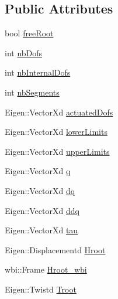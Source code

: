 \subsection*{\-Public \-Attributes}
\begin{DoxyCompactItemize}
\item 
bool \hyperlink{structOcraWbiModel_1_1OcraWbiModel__pimpl_ac779ed6d908a6e1773ce4be340bd8182}{free\-Root}
\item 
int \hyperlink{structOcraWbiModel_1_1OcraWbiModel__pimpl_a311221586ff8ca7d778b3c51129f8dd2}{nb\-Dofs}
\item 
int \hyperlink{structOcraWbiModel_1_1OcraWbiModel__pimpl_aa90eceb0093c8efcdb63be8712c3855c}{nb\-Internal\-Dofs}
\item 
int \hyperlink{structOcraWbiModel_1_1OcraWbiModel__pimpl_aae0928d1a4394598af740ab151e0d7db}{nb\-Segments}
\item 
\-Eigen\-::\-Vector\-Xd \hyperlink{structOcraWbiModel_1_1OcraWbiModel__pimpl_aca1e7991e3aa3941dfb08b58b4f8e82c}{actuated\-Dofs}
\item 
\-Eigen\-::\-Vector\-Xd \hyperlink{structOcraWbiModel_1_1OcraWbiModel__pimpl_aafa8af9a88392dbb874459894cbf181a}{lower\-Limits}
\item 
\-Eigen\-::\-Vector\-Xd \hyperlink{structOcraWbiModel_1_1OcraWbiModel__pimpl_a632b9a37d054a1dc6fcf6403e52e62e7}{upper\-Limits}
\item 
\-Eigen\-::\-Vector\-Xd \hyperlink{structOcraWbiModel_1_1OcraWbiModel__pimpl_a1f83373b2d975e1882ee7812215df997}{q}
\item 
\-Eigen\-::\-Vector\-Xd \hyperlink{structOcraWbiModel_1_1OcraWbiModel__pimpl_a6584a086fe050dab90cd4f0a0e7e970d}{dq}
\item 
\-Eigen\-::\-Vector\-Xd \hyperlink{structOcraWbiModel_1_1OcraWbiModel__pimpl_a08e61e2559239017a2dcbf99f5777d50}{ddq}
\item 
\-Eigen\-::\-Vector\-Xd \hyperlink{structOcraWbiModel_1_1OcraWbiModel__pimpl_a3dc9c0b3d43f7406a6b89bd2a2af5642}{tau}
\item 
\-Eigen\-::\-Displacementd \hyperlink{structOcraWbiModel_1_1OcraWbiModel__pimpl_a123381dc5b78bd79aed493801e3e6b35}{\-Hroot}
\item 
wbi\-::\-Frame \hyperlink{structOcraWbiModel_1_1OcraWbiModel__pimpl_a633b61e128305d5437d8e8c61ae63849}{\-Hroot\-\_\-wbi}
\item 
\-Eigen\-::\-Twistd \hyperlink{structOcraWbiModel_1_1OcraWbiModel__pimpl_a7028a65d7121f197364f3e5265387771}{\-Troot}
\item 

\end{DoxyCompactItemize}
